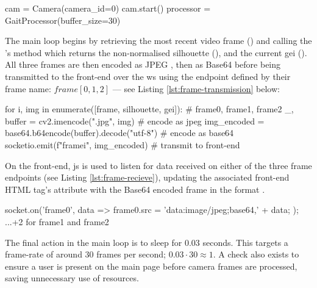 \begin{code}
cam = Camera(camera_id=0)
cam.start()
processor = GaitProcessor(buffer_size=30)
\end{code}
\label{lst:camera-class-usage} \vspace{10pt}

The main loop begins by retrieving the most recent video frame () and calling the 's  method which returns the non-normalised silhouette (), and the current \ac{gei} ().
All three frames are then encoded as JPEG , then as Base64  before being transmitted to the front-end over the \ac{ws} using the endpoint defined by their frame name: $frame[0,1,2]$ --- see Listing \ref{lst:frame-transmission} below:

\begin{code}
for i, img in enumerate([frame, silhouette, gei]): # frame0, frame1, frame2
	_, buffer = cv2.imencode(".jpg", img) # encode as jpeg
	img_encoded = base64.b64encode(buffer).decode("utf-8") # encode as base64
	socketio.emit(f"frame{i}", img_encoded) # transmit to front-end
\end{code}
\label{lst:frame-transmission} \vspace{10pt}

On the front-end, \ac{js} is used to listen for data received on either of the three frame endpoints (see Listing \ref{lst:frame-recieve}), updating the associated front-end HTML  tag's  attribute with the Base64 encoded frame in the format .

\begin{code}[minted language=javascript]
socket.on('frame0', data => {
	frame0.src = 'data:image/jpeg;base64,' + data;
});
...+2 for frame1 and frame2
\end{code}
\label{lst:frame-recieve} \vspace{10pt}

The final action in the main loop is to sleep for 0.03 seconds.
This targets a frame-rate of around 30 frames per second; $0.03 \cdot 30 \approx 1$.
A check also exists to ensure a user is present on the main page before camera frames are processed, saving unnecessary use of resources.

